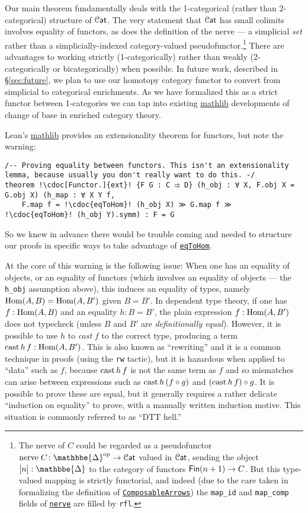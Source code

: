 \documentclass[a4paper,UKenglish,cleveref, autoref, thm-restate]{lipics-v2021}
\newcommand{\op}{\textup{op}}
\newcommand{\nerve}{\textup{nerve}}
\newcommand{\cast}{\textup{cast}}
\newcommand{\Hom}{\textup{Hom}}
\newcommand{\cat}[1]{\textup{\textsf{#1}}}%
\newcommand{\1}{\mathbbe{1}}
\newcommand{\2}{\mathbbe{2}}
\newcommand{\3}{\mathbbe{3}}
\newcommand{\DDelta}{\mathbbe{\Delta}}
\newcommand{\Fin}{\cat{Fin}}
\newcommand{\Cat}{\mathcal{C}\cat{at}}
\newcommand{\libmathlib}{\href{https://github.com/leanprover-community/mathlib}{\textsf{mathlib}}}
\newcommand{\cdoc}[2][]{\href{https://leanprover-community.github.io/mathlib4_docs/find/?pattern=CategoryTheory.#1#2\#doc}{\texttt{#2}}}
\begin{document}
Our main theorem fundamentally deals with the 1-categorical (rather than 2-categorical) structure of $\Cat$. The very statement that $\Cat$ has small colimits involves equality of functors, as does the definition of the nerve --- a simplicial \emph{set} rather than a simplicially-indexed category-valued pseudofunctor.\footnote{The nerve of $C$ could be regarded as a pseudofunctor $\nerve\;C \colon \DDelta^\op \to \Cat$ valued in $\Cat$, sending the object $[n] : \DDelta$ to the category of functors $\Fin(n+1) \to C$. But this type-valued mapping is strictly functorial, and indeed (due to the care taken in formalizing the definition of \cdoc{ComposableArrows}) the \lstinline|map_id| and \lstinline|map_comp| fields of \cdoc{nerve} are filled by \lstinline|rfl|.} There are advantages to working strictly (1-categorically) rather than weakly (2-categorically or bicategorically) when possible. In future work, described in \S\ref{sec:future}, we plan to use our homotopy category functor to convert from simplicial to categorical enrichments. As we have formalized this as a strict functor between 1-categories we can tap into existing \libmathlib{} developments of change of base in enriched category theory.

Lean's \libmathlib{} provides an extensionality theorem for functors, but note the warning:
\begin{lstlisting}
/-- Proving equality between functors. This isn't an extensionality lemma, because usually you don't really want to do this. -/
theorem !\cdoc[Functor.]{ext}! {F G : C ⥤ D} (h_obj : ∀ X, F.obj X = G.obj X) (h_map : ∀ X Y f,
    F.map f = !\cdoc{eqToHom}! (h_obj X) ≫ G.map f ≫ !\cdoc{eqToHom}! (h_obj Y).symm) : F = G
\end{lstlisting}
So we knew in advance there would be trouble coming and needed to structure our proofs in specific ways to take advantage of \cdoc{eqToHom}.

At the core of this warning is the following issue: When one has an equality of objects, or an equality of functors (which involves an equality of objects --- the \lstinline|h_obj| assumption above), this induces an equality of types, namely $\Hom(A,B)=\Hom(A,B')$ given $B=B'$. In dependent type theory, if one has $f:\Hom(A,B)$ and an equality $h:B=B'$, the plain expression $f:\Hom(A,B')$ does not typecheck (unless $B$ and $B'$ are \emph{definitionally equal}). However, it is possible to use $h$ to \emph{cast} $f$ to the correct type, producing a term $\cast\,h\,f:\Hom(A,B')$. This is also known as ``rewriting'' and it is a common technique in proofs (using the \lstinline|rw| tactic), but it is hazardous when applied to ``data'' such as $f$, because $\cast\,h\,f$ is not the same term as $f$ and so mismatches can arise between expressions such as $\cast\,h\,(f\circ g)$ and $(\cast\,h\,f)\circ g$. It is possible to prove these are equal, but it generally requires a rather delicate ``induction on equality'' to prove, with a manually written induction motive. This situation is commonly referred to as ``DTT hell.''
\end{document}

